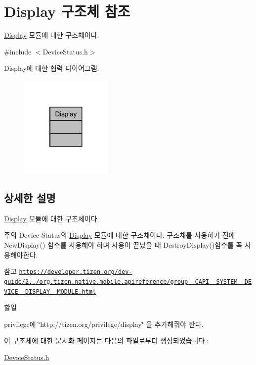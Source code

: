 \hypertarget{struct_display}{\section{Display 구조체 참조}
\label{struct_display}
}


\hyperlink{struct_display}{Display} 모듈에 대한 구조체이다.  




{\ttfamily \#include $<$Device\-Status.\-h$>$}



Display에 대한 협력 다이어그램\-:\nopagebreak
\begin{figure}[H]
\begin{center}
\leavevmode
\includegraphics[width=128pt]{struct_display__coll__graph}
\end{center}
\end{figure}


\subsection{상세한 설명}
\hyperlink{struct_display}{Display} 모듈에 대한 구조체이다. 

\begin{DoxyNote}{주의}
Device Status의 \hyperlink{struct_display}{Display} 모듈에 대한 구조체이다. 구조체를 사용하기 전에 New\-Display() 함수를 사용해야 하며 사용이 끝났을 때 Destroy\-Display()함수를 꼭 사용해야한다. 
\end{DoxyNote}
\begin{DoxySeeAlso}{참고}
\href{https://developer.tizen.org/dev-guide/2.3.0/org.tizen.native.mobile.apireference/group__CAPI__SYSTEM__DEVICE__DISPLAY__MODULE.html}{\tt https\-://developer.\-tizen.\-org/dev-\/guide/2../org.\-tizen.\-native.\-mobile.\-apireference/group\-\_\-\-\_\-\-C\-A\-P\-I\-\_\-\-\_\-\-S\-Y\-S\-T\-E\-M\-\_\-\-\_\-\-D\-E\-V\-I\-C\-E\-\_\-\-\_\-\-D\-I\-S\-P\-L\-A\-Y\-\_\-\-\_\-\-M\-O\-D\-U\-L\-E.\-html} 
\end{DoxySeeAlso}
\begin{DoxyRefDesc}{할일}
\item[\hyperlink{todo__todo000005}{할일}]privilege에 \char`\"{}http\-://tizen.\-org/privilege/display\char`\"{} 을 추가해줘야 한다. \end{DoxyRefDesc}


이 구조체에 대한 문서화 페이지는 다음의 파일로부터 생성되었습니다.\-:\begin{DoxyCompactItemize}
\item 
\hyperlink{_device_status_8h}{Device\-Status.\-h}\end{DoxyCompactItemize}
